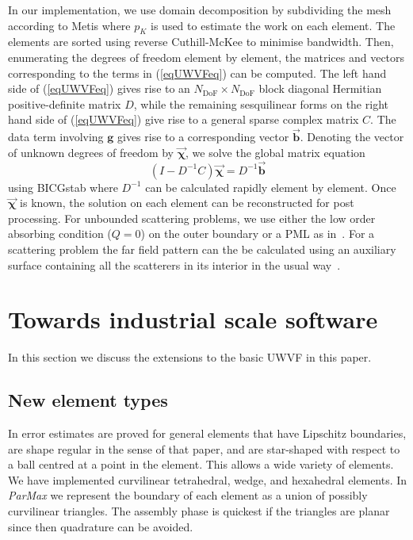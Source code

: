 \documentclass[a4paper,12pt]{article}
\newcommand{\bfchi}{\boldsymbol{\chi}}
\newcommand{\bfg}{\mathbf{g}}
\newcommand{\bfb}{\mathbf{b}}
\newcommand{\Ndof}{N_{\mathrm{DoF}}}
\begin{document}
In our implementation, we use domain decomposition by subdividing the
mesh according to Metis \cite{Karypis_metis98} where $p_K$ is used to estimate the work on each element.  The elements are sorted using reverse Cuthill-McKee to minimise bandwidth.  Then, enumerating the degrees of freedom element by element, the matrices and vectors corresponding
to the terms in (\ref{eqUWVFeq}) can be computed.  The left hand side of (\ref{eqUWVFeq}) gives rise to an 
$\Ndof\times \Ndof$ block diagonal Hermitian positive-definite matrix $D$, while the remaining sesquilinear 
forms on the right hand side of (\ref{eqUWVFeq}) give rise to a general sparse complex matrix $C$.  The data term involving $\bfg$ gives rise
to a corresponding vector $\vec{\bfb}$.  Denoting the vector of unknown degrees of freedom by $\vec{\bfchi}$, we 
solve the global matrix equation
\begin{equation}
(I-D^{-1}C)\vec{\bfchi}=D^{-1}\vec{\bfb}\label{dc}
\end{equation}
using BICGstab where $D^{-1}$ can be calculated rapidly element by element.  Once $\vec{\bfchi}$ is known, the solution on each element can be reconstructed for post processing.  For unbounded scattering problems, we use either the low order absorbing condition ($Q=0$) on the outer boundary or a PML as in~\cite{Huttunen2007}.  For a scattering problem the far field pattern can the be calculated using an auxiliary surface 
containing all the scatterers in its interior in the usual way~\cite{cessenat_phd}.

    
\section{Towards industrial scale software}\label{TISC}
In this section we discuss the extensions to the basic UWVF in this paper.
 
\subsection{New element types}
 
In \cite{HMP13} error estimates are proved for general elements that have Lipschitz boundaries, are shape 
 regular in the sense of that paper,  and are star-shaped with respect to a  ball centred at a point in 
 the element.  This allows a wide variety of elements.  We have implemented curvilinear tetrahedral, 
 wedge, and hexahedral elements.  In \emph{ParMax} we represent the boundary of each element as a 
 union of possibly curvilinear triangles.  The assembly phase is quickest if the triangles are planar
 since then quadrature can be avoided.  
 
\end{document}

